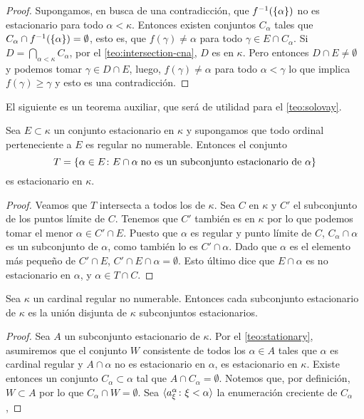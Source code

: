 \begin{proof}
    Supongamos, en busca de una contradicción, que $f^{-1}(\left\{ \alpha \right\})$ no es estacionario
    para todo $\alpha<\kappa$. Entonces existen conjuntos \cna{} $C_\alpha$ tales que
    $C_\alpha\cap f^{-1}(\left\{ \alpha \right\}) = \emptyset$, esto es,
    que $f(\gamma)\neq\alpha$ para todo $\gamma\in E\cap C_\alpha$.
    Si $D=\dint_{\alpha<\kappa} C_\alpha$,
    por el \cref{teo:intersection-cna}, $D$ es \cna{} en $\kappa$.
    Pero entonces $D\cap E\neq\emptyset$ y podemos tomar $\gamma\in D\cap E$,
    luego, $f(\gamma)\neq\alpha$ para todo $\alpha<\gamma$
    lo que implica $f(\gamma)\geq\gamma$ y esto es una contradicción.
\end{proof}

El siguiente es un teorema auxiliar, que será de utilidad para el \cref{teo:solovay}.

\begin{teo}\label{teo:stationary}
    Sea $E\subset\kappa$ un conjunto estacionario en $\kappa$ y supongamos que todo
    ordinal perteneciente a $E$ es regular no numerable. Entonces el conjunto
    \[
        T=\left\{ \alpha\in E\colon
            E\cap\alpha\;\text{no es un subconjunto estacionario de $\alpha$} \right\}
    \]
    es estacionario en $\kappa$.
\end{teo}

\begin{proof}
    Veamos que $T$ intersecta a todos los \cna{} de $\kappa$.
    Sea $C$ \cna{} en $\kappa$ y $C'$ el subconjunto de los puntos límite de $C$.
    Tenemos que $C'$ también es \cna{} en $\kappa$ por lo que podemos tomar
    el menor $\alpha\in C'\cap E$.
    Puesto que $\alpha$ es regular y punto límite de $C$, $C_\alpha\cap\alpha$ es un subconjunto
    \cna{} de $\alpha$, como también lo es $C'\cap\alpha$. Dado que $\alpha$ es el elemento
    más pequeño de $C'\cap E$, $C'\cap E\cap\alpha = \emptyset$. Esto último
    dice que $E\cap\alpha$ es no estacionario en $\alpha$, y $\alpha\in T\cap C$.
\end{proof}

\begin{teo}[Solovay]\label{teo:solovay}
    Sea $\kappa$ un cardinal regular no numerable. Entonces cada subconjunto estacionario
    de $\kappa$ es la unión disjunta de $\kappa$ subconjuntos estacionarios.
\end{teo}

\begin{proof}
    Sea $A$ un subconjunto estacionario de $\kappa$.
    Por el \cref{teo:stationary}, asumiremos que el conjunto $W$
    consistente de todos los $\alpha\in A$ tales que $\alpha$ es cardinal
    regular y $A\cap\alpha$ no es estacionario en $\alpha$, es estacionario en $\kappa$.
    Existe entonces un conjunto \cna{} $C_\alpha\subset\alpha$ tal que $A\cap C_\alpha = \emptyset$.
    Notemos que, por definición, $W\subset A$ por lo que $C_\alpha\cap W=\emptyset$.
    Sea $\langle a_\xi^\alpha\colon\xi<\alpha \rangle$ la enumeración creciente de $C_\alpha$,
\end{proof}

